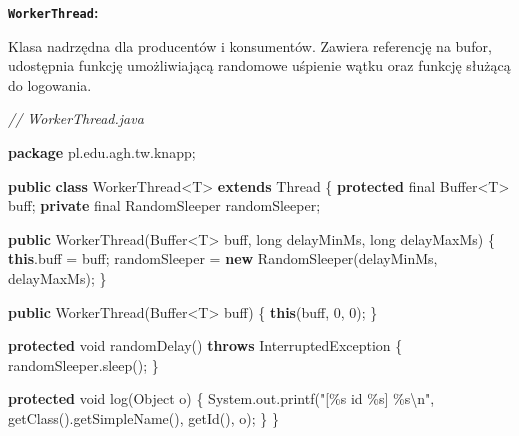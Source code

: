 \documentclass[11pt]{article}
\newenvironment{Shaded}{}{}
\newcommand{\KeywordTok}[1]{\textcolor[rgb]{0.00,0.44,0.13}{\textbf{{#1}}}}
\newcommand{\DataTypeTok}[1]{\textcolor[rgb]{0.56,0.13,0.00}{{#1}}}
\newcommand{\DecValTok}[1]{\textcolor[rgb]{0.25,0.63,0.44}{{#1}}}
\newcommand{\StringTok}[1]{\textcolor[rgb]{0.25,0.44,0.63}{{#1}}}
\newcommand{\CommentTok}[1]{\textcolor[rgb]{0.38,0.63,0.69}{\textit{{#1}}}}
\newcommand{\FunctionTok}[1]{\textcolor[rgb]{0.02,0.16,0.49}{{#1}}}
\newcommand{\NormalTok}[1]{{#1}}
\newcommand{\SpecialCharTok}[1]{\textcolor[rgb]{0.25,0.44,0.63}{{#1}}}
\newcommand{\ImportTok}[1]{{#1}}
\newcommand{\OperatorTok}[1]{\textcolor[rgb]{0.40,0.40,0.40}{{#1}}}
\newcommand{\BuiltInTok}[1]{{#1}}
\begin{document}
\textbf{\texttt{WorkerThread}:}

Klasa nadrzędna dla producentów i konsumentów. Zawiera referencję na
bufor, udostępnia funkcję umożliwiającą randomowe uśpienie wątku oraz
funkcję służącą do logowania.

\begin{Shaded}
\begin{Highlighting}[]
\CommentTok{// WorkerThread.java}

\KeywordTok{package}\ImportTok{ pl}\OperatorTok{.}\ImportTok{edu}\OperatorTok{.}\ImportTok{agh}\OperatorTok{.}\ImportTok{tw}\OperatorTok{.}\ImportTok{knapp}\OperatorTok{;}

\KeywordTok{public} \KeywordTok{class}\NormalTok{ WorkerThread}\OperatorTok{\textless{}}\NormalTok{T}\OperatorTok{\textgreater{}} \KeywordTok{extends} \BuiltInTok{Thread} \OperatorTok{\{}
    \KeywordTok{protected} \DataTypeTok{final} \BuiltInTok{Buffer}\OperatorTok{\textless{}}\NormalTok{T}\OperatorTok{\textgreater{}}\NormalTok{ buff}\OperatorTok{;}
    \KeywordTok{private} \DataTypeTok{final}\NormalTok{ RandomSleeper randomSleeper}\OperatorTok{;}

    \KeywordTok{public} \FunctionTok{WorkerThread}\OperatorTok{(}\BuiltInTok{Buffer}\OperatorTok{\textless{}}\NormalTok{T}\OperatorTok{\textgreater{}}\NormalTok{ buff}\OperatorTok{,} \DataTypeTok{long}\NormalTok{ delayMinMs}\OperatorTok{,} \DataTypeTok{long}\NormalTok{ delayMaxMs}\OperatorTok{)} \OperatorTok{\{}
        \KeywordTok{this}\OperatorTok{.}\FunctionTok{buff} \OperatorTok{=}\NormalTok{ buff}\OperatorTok{;}
\NormalTok{        randomSleeper }\OperatorTok{=} \KeywordTok{new} \FunctionTok{RandomSleeper}\OperatorTok{(}\NormalTok{delayMinMs}\OperatorTok{,}\NormalTok{ delayMaxMs}\OperatorTok{);}
    \OperatorTok{\}}

    \KeywordTok{public} \FunctionTok{WorkerThread}\OperatorTok{(}\BuiltInTok{Buffer}\OperatorTok{\textless{}}\NormalTok{T}\OperatorTok{\textgreater{}}\NormalTok{ buff}\OperatorTok{)} \OperatorTok{\{}
        \KeywordTok{this}\OperatorTok{(}\NormalTok{buff}\OperatorTok{,} \DecValTok{0}\OperatorTok{,} \DecValTok{0}\OperatorTok{);}
    \OperatorTok{\}}
    
    \KeywordTok{protected} \DataTypeTok{void} \FunctionTok{randomDelay}\OperatorTok{()} \KeywordTok{throws} \BuiltInTok{InterruptedException} \OperatorTok{\{}
\NormalTok{        randomSleeper}\OperatorTok{.}\FunctionTok{sleep}\OperatorTok{();}
    \OperatorTok{\}}

    \KeywordTok{protected} \DataTypeTok{void} \FunctionTok{log}\OperatorTok{(}\BuiltInTok{Object}\NormalTok{ o}\OperatorTok{)} \OperatorTok{\{}
        \BuiltInTok{System}\OperatorTok{.}\FunctionTok{out}\OperatorTok{.}\FunctionTok{printf}\OperatorTok{(}\StringTok{"[}\SpecialCharTok{\%s}\StringTok{ id }\SpecialCharTok{\%s}\StringTok{] }\SpecialCharTok{\%s\textbackslash{}n}\StringTok{"}\OperatorTok{,} \FunctionTok{getClass}\OperatorTok{().}\FunctionTok{getSimpleName}\OperatorTok{(),} \FunctionTok{getId}\OperatorTok{(),}\NormalTok{ o}\OperatorTok{);}
    \OperatorTok{\}}
\OperatorTok{\}}
\end{Highlighting}
\end{Shaded}
\end{document}
